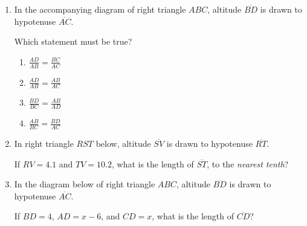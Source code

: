 \documentclass[12pt, oneside]{article}
\begin{document}
\begin{enumerate}[itemsep=2cm]
\item In the accompanying diagram of right triangle $ABC$, altitude $\overline{BD}$ is drawn to hypotenuse $\overline{AC}$.
  \begin{center}
  \end{center}
  Which statement must be true?
  \begin{multicols}{2}
    \begin{enumerate}
      \item $\displaystyle \frac{AD}{AB} = \frac{BC}{AC}$
      \item $\displaystyle \frac{AD}{AB} = \frac{AB}{AC}$ 
      \item $\displaystyle \frac{BD}{BC} = \frac{AB}{AD}$
      \item $\displaystyle \frac{AB}{BC} = \frac{BD}{AC}$
    \end{enumerate}
  \end{multicols}

\newpage
\item In right triangle $RST$ below, altitude $\overline{SV}$ is drawn to hypotenuse $\overline{RT}$.
  \begin{center}
  \end{center}
If $RV=4.1$ and $TV=10.2$, what is the length of $\overline{ST}$, to the \emph{nearest tenth}?

\item In the diagram below of right triangle $ABC$, altitude $\overline{BD}$ is drawn to hypotenuse $\overline{AC}$.
  \begin{center}
  \end{center}
If $BD=4$, $AD=x-6$, and $CD=x$, what is the length of $\overline{CD}$?


\end{enumerate}
\end{document}
